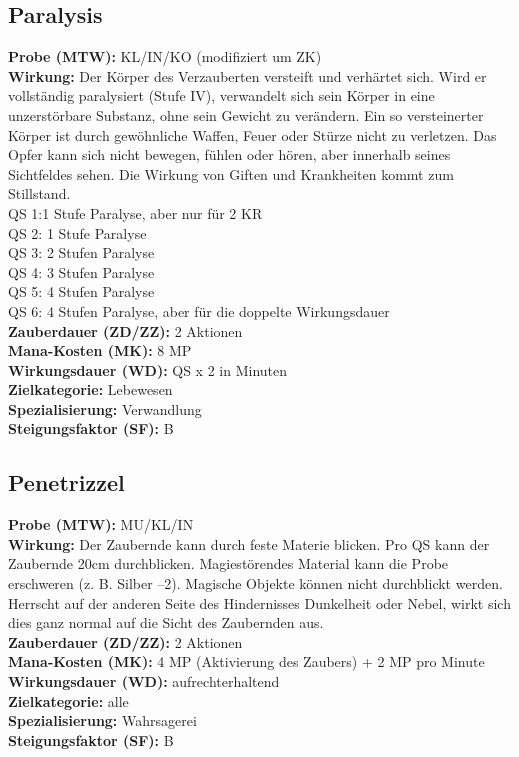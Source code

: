 \subsection{Paralysis}
\label{chap:paralysis}
\textbf{Probe (MTW):} KL/IN/KO (modifiziert um ZK) \\
\textbf{Wirkung:} Der  Körper  des  Verzauberten  versteift und verhärtet sich. Wird er vollständig paralysiert (Stufe IV), verwandelt sich sein Körper in eine unzerstörbare Substanz, ohne sein Gewicht zu verändern. Ein so versteinerter Körper ist durch gewöhnliche Waffen, Feuer oder Stürze nicht zu verletzen. Das  Opfer  kann  sich  nicht  bewegen,  fühlen  oder hören, aber innerhalb seines Sichtfeldes sehen. Die Wirkung  von  Giften  und  Krankheiten  kommt  zum Stillstand.\\
QS 1:1 Stufe Paralyse, aber nur für 2 KR\\
QS 2: 1 Stufe Paralyse\\
QS 3: 2 Stufen Paralyse\\
QS 4: 3 Stufen Paralyse\\
QS 5: 4 Stufen Paralyse\\
QS 6: 4 Stufen Paralyse, aber für die doppelte Wirkungsdauer\\
\textbf{Zauberdauer (ZD/ZZ):} 2 Aktionen \\
\textbf{Mana-Kosten (MK):} 8 MP \\
\textbf{Wirkungsdauer (WD):} QS x 2 in Minuten \\
\textbf{Zielkategorie:} Lebewesen \\
\textbf{Spezialisierung:} Verwandlung \\
\textbf{Steigungsfaktor (SF):} B


\subsection{Penetrizzel}
\label{chap:penetrizzel}
\textbf{Probe (MTW):} MU/KL/IN \\
\textbf{Wirkung:} Der Zaubernde kann durch feste Materie blicken. Pro QS kann der Zaubernde 20cm durchblicken. Magiestörendes Material kann die Probe erschweren (z. B. Silber –2). Magische Objekte können nicht durchblickt werden. Herrscht auf der anderen Seite des Hindernisses Dunkelheit oder Nebel, wirkt sich dies ganz normal auf die Sicht des Zaubernden aus. \\
\textbf{Zauberdauer (ZD/ZZ):} 2 Aktionen \\
\textbf{Mana-Kosten (MK):} 4 MP (Aktivierung des Zaubers) + 2 MP pro Minute \\
\textbf{Wirkungsdauer (WD):} aufrechterhaltend \\
\textbf{Zielkategorie:} alle \\
\textbf{Spezialisierung:} Wahrsagerei \\
\textbf{Steigungsfaktor (SF):} B


